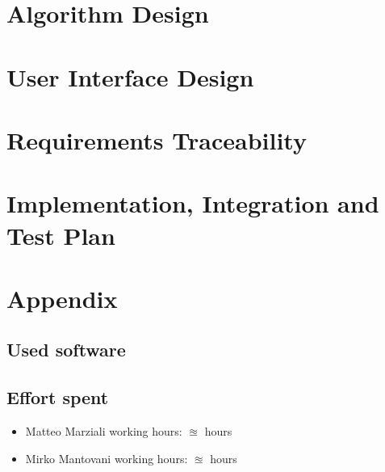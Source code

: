 \documentclass{article}
\begin{document}
\clearpage
\section{Algorithm Design}



\section{User Interface Design}


\clearpage
\section{Requirements Traceability}

\clearpage
\section{Implementation, Integration and Test Plan}



\clearpage
\section{Appendix}

\subsection{Used software}


\subsection{Effort spent}
\begin{itemize}

\item Matteo Marziali working hours:  $\approxeq$ hours

\item Mirko Mantovani working hours:  $\approxeq$ hours



\end{itemize}
\end{document}
